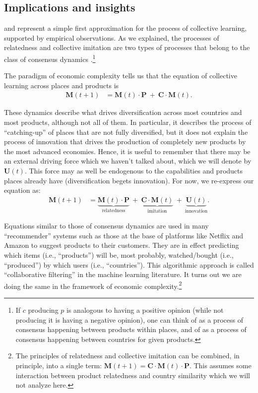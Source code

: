 \documentclass[12pt]{article}
\newcommand{\mtx}[1]{\mathbf{ #1}}
\begin{document}

\subsection{Implications and insights}
 and  represent a simple first approximation for the process of collective learning, supported by empirical observations. As we explained, the processes of relatedness and collective imitation are two types of processes that belong to the class of consensus dynamics \citep{degroot1974reaching}.\footnote{If $c$ producing $p$ is analogous to having a positive opinion (while not producing it is having a negative opinion), one can think of  as a process of consensus happening between products within places, and of  as a process of consensus happening between countries for given products.} 

The paradigm of economic complexity tells us that the equation of collective learning across places and products is
\begin{align}
	\mtx{M}(t+1) &= \mtx{M}(t)\cdot \mtx{P} ~ + ~ \mtx{C}\cdot\mtx{M}(t).
\label{eq_collectivelearning}
\end{align}

These dynamics describe what drives diversification across most countries and most products, although not all of them. In particular, it describes the process of ``catching-up'' of places that are not fully diversified, but it does not explain the process of innovation that drives the production of completely new products by the most advanced economies. Hence, it is useful to remember that there may be an external driving force which we haven't talked about, which we will denote by $\mtx{U}(t)$. This force may as well be endogenous to the capabilities and products places already have (diversification begets innovation). For now, we re-express our equation as:
\begin{align}
	\mtx{M}(t+1) &= \underbrace{\mtx{M}(t)\cdot \mtx{P}}_{\text{relatedness}} ~ + ~ \underbrace{\mtx{C}\cdot\mtx{M}(t)}_{\text{imitation}}  ~ + ~ \underbrace{\mtx{U}(t)}_{\text{innovation}}.
\end{align}

Equations similar to those of consensus dynamics are used in many ``recommender'' systems such as those at the base of platforms like Netflix and Amazon to suggest products to their customers. They are in effect predicting which items (i.e., ``products'') will be, most probably, watched/bought (i.e., ``produced'') by which users (i.e., ``countries''). This algorithmic approach is called ``collaborative filtering'' in the machine learning literature. It turns out we are doing the same in the framework of economic complexity.\footnote{The principles of relatedness and collective imitation can be combined, in principle, into a single term: $\mtx{M}(t+1) = \mtx{C}\cdot\mtx{M}(t)\cdot \mtx{P}$. This assumes some interaction between product relatedness and country similarity which we will not analyze here.}
\end{document}
